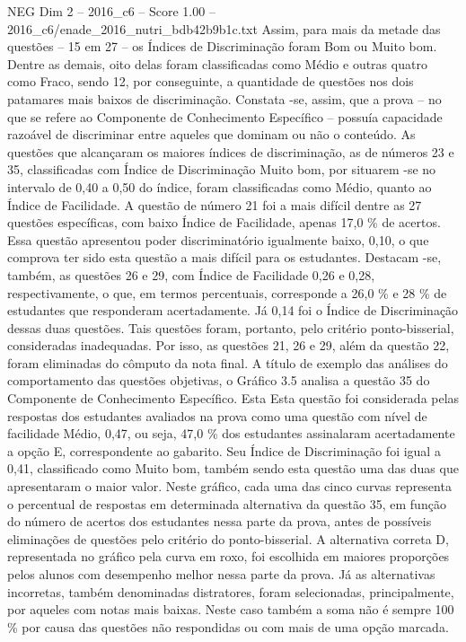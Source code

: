 \begin{textsample}{NEG Dim 2 – 2016\_c6 – Score 1.00 – 2016\_c6/enade\_2016\_nutri\_bdb42b9b1c.txt}
Assim, para mais da metade das questões – 15 em 27 – os Índices de Discriminação foram Bom ou Muito bom.
Dentre as demais, oito delas foram classificadas como Médio e outras quatro como Fraco, sendo 12, por conseguinte, a quantidade de questões nos dois patamares mais baixos de discriminação.
Constata -se, assim, que a prova – no que se refere ao Componente de Conhecimento Específico – possuía capacidade razoável de discriminar entre aqueles que dominam ou não o conteúdo.
As questões que alcançaram os maiores índices de discriminação, as de números 23 e 35, classificadas com Índice de Discriminação Muito bom, por situarem -se no intervalo de 0,40 a 0,50 do índice, foram classificadas como Médio, quanto ao Índice de Facilidade.
A questão de número 21 foi a mais difícil dentre as 27 questões específicas, com baixo Índice de Facilidade, apenas 17,0 \% de acertos.
Essa questão apresentou poder discriminatório igualmente baixo, 0,10, o que comprova ter sido esta questão a mais difícil para os estudantes.
Destacam -se, também, as questões 26 e 29, com Índice de Facilidade 0,26 e 0,28, respectivamente, o que, em termos percentuais, corresponde a 26,0 \% e 28 \% de estudantes que responderam acertadamente.
Já 0,14 foi o Índice de Discriminação dessas duas questões.
Tais questões foram, portanto, pelo critério ponto-bisserial, consideradas inadequadas.
Por isso, as questões 21, 26 e 29, além da questão 22, foram eliminadas do cômputo da nota final.
A título de exemplo das análises do comportamento das questões objetivas, o Gráfico 3.5 analisa a questão 35 do Componente de Conhecimento Específico.
Esta Esta questão foi considerada pelas respostas dos estudantes avaliados na prova como uma questão com nível de facilidade Médio, 0,47, ou seja, 47,0 \% dos estudantes assinalaram acertadamente a opção E, correspondente ao gabarito.
Seu Índice de Discriminação foi igual a 0,41, classificado como Muito bom, também sendo esta questão uma das duas que apresentaram o maior valor.
Neste gráfico, cada uma das cinco curvas representa o percentual de respostas em determinada alternativa da questão 35, em função do número de acertos dos estudantes nessa parte da prova, antes de possíveis eliminações de questões pelo critério do ponto-bisserial.
A alternativa correta D, representada no gráfico pela curva em roxo, foi escolhida em maiores proporções pelos alunos com desempenho melhor nessa parte da prova.
Já as alternativas incorretas, também denominadas distratores, foram selecionadas, principalmente, por aqueles com notas mais baixas.
Neste caso também a soma não é sempre 100 \% por causa das questões não respondidas ou com mais de uma opção marcada.

\end{textsample}
